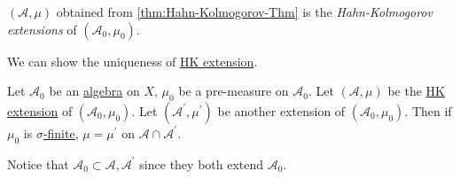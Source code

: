 \begin{definition}[HK extension]\label{def:HK-extension}
	\((\mathcal{A} , \mu )\) obtained from \autoref{thm:Hahn-Kolmogorov-Thm} is the \emph{Hahn-Kolmogorov extensions} of \((\mathcal{A} _0, \mu _0)\).
\end{definition}

We can show the uniqueness of \hyperref[def:HK-extension]{HK extension}.

\begin{theorem}\label{thm:uniqueness-of-HK-extension}
	Let \(\mathcal{A}_0\) be an \hyperref[def:algebra]{algebra} on \(X\), \(\mu _0\) be a pre-measure on \(\mathcal{A} _0\). Let \((\mathcal{A} , \mu)\)
	be the \hyperref[def:HK-extension]{HK extension} of \((\mathcal{A} _0, \mu _0)\). Let \((\mathcal{A} ^\prime , \mu ^\prime )\) be another extension of \((\mathcal{A} _0, \mu _0)\).
	Then if \(\mu _0\) is \hyperref[def:finite-measure]{\(\sigma\)-finite}, \(\mu  = \mu ^\prime \) on \(\mathcal{A} \cap \mathcal{A} ^\prime \).
\end{theorem}
\begin{note}
	Notice that \(\mathcal{A}_0 \subset \mathcal{A}, \mathcal{A} ^\prime \) since they both extend \(\mathcal{A}_0\).
\end{note}
